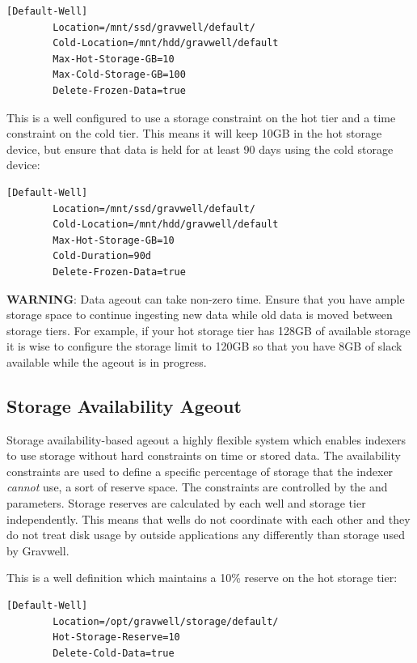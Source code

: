{{\begin{Verbatim}[breaklines=true]
[Default-Well]
        Location=/mnt/ssd/gravwell/default/
        Cold-Location=/mnt/hdd/gravwell/default
        Max-Hot-Storage-GB=10
        Max-Cold-Storage-GB=100
        Delete-Frozen-Data=true
\end{Verbatim}

This is a well configured to use a storage constraint on the hot tier
and a time constraint on the cold tier. This means it will keep 10GB in
the hot storage device, but ensure that data is held for at least 90
days using the cold storage device:

\begin{Verbatim}[breaklines=true]
[Default-Well]
        Location=/mnt/ssd/gravwell/default/
        Cold-Location=/mnt/hdd/gravwell/default
        Max-Hot-Storage-GB=10
        Cold-Duration=90d
        Delete-Frozen-Data=true
\end{Verbatim}

\textbf{WARNING}: Data ageout can take non-zero time. Ensure that you have
ample storage space to continue ingesting new data while old data is
moved between storage tiers. For example, if your hot storage tier has
128GB of available storage it is wise to configure the storage limit to
120GB so that you have 8GB of slack available while the ageout is in
progress.

\subsection{Storage Availability Ageout}

Storage availability-based ageout a highly flexible system which
enables indexers to use storage without hard constraints on time or
stored data. The availability constraints are used to define a specific
percentage of storage that the indexer \emph{cannot} use, a sort of reserve
space. The constraints are controlled by the
 and  parameters.
Storage reserves are calculated by each well and storage tier
independently. This means that wells do not coordinate with each other
and they do not treat disk usage by outside applications any differently
than storage used by Gravwell.

This is a well definition which maintains a 10\% reserve on the hot
storage tier:

\begin{Verbatim}[breaklines=true]
[Default-Well]
        Location=/opt/gravwell/storage/default/
        Hot-Storage-Reserve=10
        Delete-Cold-Data=true
\end{Verbatim}

}}
